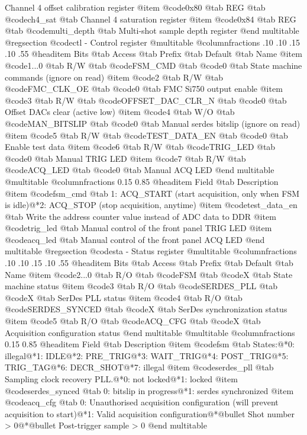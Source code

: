 Channel 4 offset calibration register
@item @code{0x80} @tab
REG @tab
@code{ch4_sat} @tab
Channel 4 saturation register
@item @code{0x84} @tab
REG @tab
@code{multi_depth} @tab
Multi-shot sample depth register
@end multitable 
@regsection @code{ctl} - Control register
@multitable @columnfractions .10 .10 .15 .10 .55
@headitem Bits @tab Access @tab Prefix @tab Default @tab Name
@item @code{1...0}
@tab R/W @tab
@code{FSM_CMD}
@tab @code{0} @tab 
State machine commands (ignore on read)
@item @code{2}
@tab R/W @tab
@code{FMC_CLK_OE}
@tab @code{0} @tab 
FMC Si750 output enable
@item @code{3}
@tab R/W @tab
@code{OFFSET_DAC_CLR_N}
@tab @code{0} @tab 
Offset DACs clear (active low)
@item @code{4}
@tab W/O @tab
@code{MAN_BITSLIP}
@tab @code{0} @tab 
Manual serdes bitslip (ignore on read)
@item @code{5}
@tab R/W @tab
@code{TEST_DATA_EN}
@tab @code{0} @tab 
Enable test data
@item @code{6}
@tab R/W @tab
@code{TRIG_LED}
@tab @code{0} @tab 
Manual TRIG LED
@item @code{7}
@tab R/W @tab
@code{ACQ_LED}
@tab @code{0} @tab 
Manual ACQ LED
@end multitable
@multitable @columnfractions 0.15 0.85
@headitem Field @tab Description
@item @code{fsm_cmd} @tab 1: ACQ_START (start acquisition, only when FSM is idle)@*2: ACQ_STOP (stop acquisition, anytime)
@item @code{test_data_en} @tab Write the address counter value instead of ADC data to DDR
@item @code{trig_led} @tab Manual control of the front panel TRIG LED
@item @code{acq_led} @tab Manual control of the front panel ACQ LED
@end multitable
@regsection @code{sta} - Status register
@multitable @columnfractions .10 .10 .15 .10 .55
@headitem Bits @tab Access @tab Prefix @tab Default @tab Name
@item @code{2...0}
@tab R/O @tab
@code{FSM}
@tab @code{X} @tab 
State machine status
@item @code{3}
@tab R/O @tab
@code{SERDES_PLL}
@tab @code{X} @tab 
SerDes PLL status
@item @code{4}
@tab R/O @tab
@code{SERDES_SYNCED}
@tab @code{X} @tab 
SerDes synchronization status
@item @code{5}
@tab R/O @tab
@code{ACQ_CFG}
@tab @code{X} @tab 
Acquisition configuration status
@end multitable
@multitable @columnfractions 0.15 0.85
@headitem Field @tab Description
@item @code{fsm} @tab States:@*0: illegal@*1: IDLE@*2: PRE_TRIG@*3: WAIT_TRIG@*4: POST_TRIG@*5: TRIG_TAG@*6: DECR_SHOT@*7: illegal
@item @code{serdes_pll} @tab Sampling clock recovery PLL.@*0: not locked@*1: locked
@item @code{serdes_synced} @tab 0: bitslip in progress@*1: serdes synchronized
@item @code{acq_cfg} @tab 0: Unauthorised acquisition configuration (will prevent acquisition to start)@*1: Valid acquisition configuration@*@bullet{}  Shot number > 0@*@bullet{}  Post-trigger sample > 0
@end multitable
